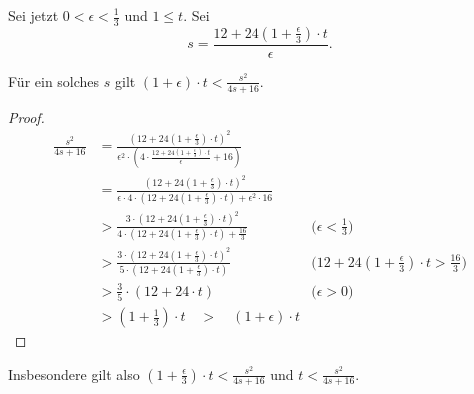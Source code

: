     Sei jetzt $0 < \epsilon < \frac{1}{3}$ und $1 \leq t$. Sei 
    \[
    s = \frac{12 + 24(1 + \frac{\epsilon}{3})\cdot t}{\epsilon}.
    \]
    
    \begin{lemma}
    	\label{lem:tsmallers}
    	Für ein solches $s$ gilt $(1 + \epsilon) \cdot t < \frac{s^2}{4s + 16}$.
    \end{lemma}
    \begin{proof}
    	\begin{align*}
	    	\frac{s^2}{4s + 16} &= \frac{(12 + 24(1 + \frac{\epsilon}{3})\cdot t)^2}{\epsilon^2 \cdot (4 \cdot \frac{12 + 24(1 + \frac{\epsilon}{3})\cdot t}{\epsilon} + 16)} & 
	    	\\ &= \frac{(12 + 24(1 + \frac{\epsilon}{3})\cdot t)^2}{\epsilon \cdot 4 \cdot (12 + 24(1 + \frac{\epsilon}{3})\cdot t) + \epsilon^2 \cdot 16} &
	    	\\ &> \frac{3 \cdot (12 + 24(1 + \frac{\epsilon}{3})\cdot t)^2}{4 \cdot (12 + 24(1 + \frac{\epsilon}{3})\cdot t) + \frac{16}{3}} & \text{($\epsilon < \frac{1}{3}$)}
	    	\\ &> \frac{3 \cdot (12 + 24(1 + \frac{\epsilon}{3})\cdot t)^2}{5 \cdot (12 + 24(1 + \frac{\epsilon}{3})\cdot t)} & \text{($12 + 24(1 + \frac{\epsilon}{3})\cdot t > \frac{16}{3}$)}
	    	\\ &> \frac{3}{5}\cdot (12 + 24 \cdot t) & \text{($\epsilon > 0$)}
	    	\\ &> (1 + \frac{1}{3}) \cdot t \quad >\quad (1 + \epsilon) \cdot t
    	\end{align*}
    \end{proof}
    Insbesondere gilt also $(1 + \frac{\epsilon}{3})\cdot t < \frac{s^2}{4s + 16}$ und $t < \frac{s^2}{4s + 16}$.
    
